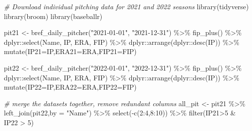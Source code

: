 \documentclass[
  11pt,
]{book}
\newenvironment{Shaded}{\begin{snugshade}}{\end{snugshade}}
\newcommand{\AttributeTok}[1]{\textcolor[rgb]{0.77,0.63,0.00}{#1}}
\newcommand{\CommentTok}[1]{\textcolor[rgb]{0.56,0.35,0.01}{\textit{#1}}}
\newcommand{\DecValTok}[1]{\textcolor[rgb]{0.00,0.00,0.81}{#1}}
\newcommand{\FunctionTok}[1]{\textcolor[rgb]{0.00,0.00,0.00}{#1}}
\newcommand{\NormalTok}[1]{#1}
\newcommand{\OtherTok}[1]{\textcolor[rgb]{0.56,0.35,0.01}{#1}}
\newcommand{\SpecialCharTok}[1]{\textcolor[rgb]{0.00,0.00,0.00}{#1}}
\newcommand{\StringTok}[1]{\textcolor[rgb]{0.31,0.60,0.02}{#1}}
\theoremstyle{definition}
\theoremstyle{definition}
\theoremstyle{definition}
\theoremstyle{definition}
\theoremstyle{remark}
\begin{document}
\begin{Shaded}
\begin{Highlighting}[]
\CommentTok{\# Download individual pitching data for 2021 and 2022 seasons}
\FunctionTok{library}\NormalTok{(tidyverse)}
\FunctionTok{library}\NormalTok{(broom)}
\FunctionTok{library}\NormalTok{(baseballr)}

\NormalTok{pit21 }\OtherTok{\textless{}{-}} \FunctionTok{bref\_daily\_pitcher}\NormalTok{(}\StringTok{"2021{-}01{-}01"}\NormalTok{, }\StringTok{"2021{-}12{-}31"}\NormalTok{) }\SpecialCharTok{\%\textgreater{}\%} 
  \FunctionTok{fip\_plus}\NormalTok{() }\SpecialCharTok{\%\textgreater{}\%} 
\NormalTok{  dplyr}\SpecialCharTok{::}\FunctionTok{select}\NormalTok{(Name, IP, ERA, FIP) }\SpecialCharTok{\%\textgreater{}\%}
\NormalTok{  dplyr}\SpecialCharTok{::}\FunctionTok{arrange}\NormalTok{(dplyr}\SpecialCharTok{::}\FunctionTok{desc}\NormalTok{(IP)) }\SpecialCharTok{\%\textgreater{}\%}
  \FunctionTok{mutate}\NormalTok{(}\AttributeTok{IP21=}\NormalTok{IP,}\AttributeTok{ERA21=}\NormalTok{ERA,}\AttributeTok{FIP21=}\NormalTok{FIP)}

\NormalTok{pit22 }\OtherTok{\textless{}{-}} \FunctionTok{bref\_daily\_pitcher}\NormalTok{(}\StringTok{"2022{-}01{-}01"}\NormalTok{, }\StringTok{"2022{-}12{-}31"}\NormalTok{) }\SpecialCharTok{\%\textgreater{}\%} 
  \FunctionTok{fip\_plus}\NormalTok{() }\SpecialCharTok{\%\textgreater{}\%} 
\NormalTok{  dplyr}\SpecialCharTok{::}\FunctionTok{select}\NormalTok{(Name, IP, ERA, FIP) }\SpecialCharTok{\%\textgreater{}\%}
\NormalTok{  dplyr}\SpecialCharTok{::}\FunctionTok{arrange}\NormalTok{(dplyr}\SpecialCharTok{::}\FunctionTok{desc}\NormalTok{(IP)) }\SpecialCharTok{\%\textgreater{}\%}
  \FunctionTok{mutate}\NormalTok{(}\AttributeTok{IP22=}\NormalTok{IP,}\AttributeTok{ERA22=}\NormalTok{ERA,}\AttributeTok{FIP22=}\NormalTok{FIP)}

\CommentTok{\# merge the datasets together, remove redundant columns}
\NormalTok{all\_pit }\OtherTok{\textless{}{-}}\NormalTok{ pit21 }\SpecialCharTok{\%\textgreater{}\%} 
  \FunctionTok{left\_join}\NormalTok{(pit22,}\AttributeTok{by =} \StringTok{"Name"}\NormalTok{) }\SpecialCharTok{\%\textgreater{}\%} 
  \FunctionTok{select}\NormalTok{(}\SpecialCharTok{{-}}\FunctionTok{c}\NormalTok{(}\DecValTok{2}\SpecialCharTok{:}\DecValTok{4}\NormalTok{,}\DecValTok{8}\SpecialCharTok{:}\DecValTok{10}\NormalTok{)) }\SpecialCharTok{\%\textgreater{}\%}
  \FunctionTok{filter}\NormalTok{(IP21}\SpecialCharTok{\textgreater{}}\DecValTok{5} \SpecialCharTok{\&}\NormalTok{ IP22 }\SpecialCharTok{\textgreater{}} \DecValTok{5}\NormalTok{)}


\end{Highlighting}
\end{Shaded}
\end{document}
